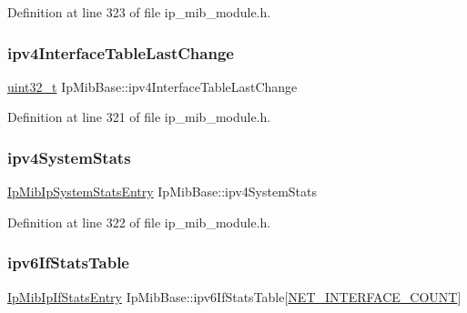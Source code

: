 Definition at line 323 of file ip\+\_\+mib\+\_\+module.\+h.

\mbox{\label{structIpMibBase_a3d40069243af37f8246adb927d33dbdd}} 
\subsubsection{\texorpdfstring{ipv4\+Interface\+Table\+Last\+Change}{ipv4InterfaceTableLastChange}}
{\footnotesize\ttfamily \hyperlink{stdint_8h_a435d1572bf3f880d55459d9805097f62}{uint32\+\_\+t} Ip\+Mib\+Base\+::ipv4\+Interface\+Table\+Last\+Change}



Definition at line 321 of file ip\+\_\+mib\+\_\+module.\+h.

\mbox{\label{structIpMibBase_aba331a91325ca8ad19421914790ec778}} 
\subsubsection{\texorpdfstring{ipv4\+System\+Stats}{ipv4SystemStats}}
{\footnotesize\ttfamily \hyperlink{structIpMibIpSystemStatsEntry}{Ip\+Mib\+Ip\+System\+Stats\+Entry} Ip\+Mib\+Base\+::ipv4\+System\+Stats}



Definition at line 322 of file ip\+\_\+mib\+\_\+module.\+h.

\mbox{\label{structIpMibBase_acc0b379352de70154f7afdfe8db306eb}} 
\subsubsection{\texorpdfstring{ipv6\+If\+Stats\+Table}{ipv6IfStatsTable}}
{\footnotesize\ttfamily \hyperlink{structIpMibIpIfStatsEntry}{Ip\+Mib\+Ip\+If\+Stats\+Entry} Ip\+Mib\+Base\+::ipv6\+If\+Stats\+Table\mbox{[}\hyperlink{net__config_8h_a116f850ebcb023ffa3e6b8de10c5cb35}{N\+E\+T\+\_\+\+I\+N\+T\+E\+R\+F\+A\+C\+E\+\_\+\+C\+O\+U\+NT}\mbox{]}}



